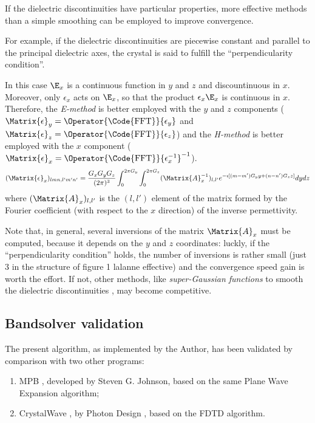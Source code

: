 If the dielectric discontinuities have particular properties, more
effective methods than a simple smoothing can be employed
to improve convergence.

For example, if the dielectric discontinuities are piecewise constant
and parallel to the principal dielectric axes, the crystal is said to
fulfill the ``perpendicularity condition''.


In this case $\E_x$ is a continuous function in $y$ and $z$ and
discountinuous in $x$. Moreover, only $\epsilon_x$ acts on $\E_x$, so
that the product $\epsilon_x \E_x$ is continuous in $x$. Therefore,
the \emph{E-method} is better employed with the $y$ and $z$ components
($\Matrix{\epsilon}_y = \Operator{\mbox{\Code{FFT}}}{\epsilon_y}$ and
$\Matrix{\epsilon}_z = \Operator{\mbox{\Code{FFT}}}{\epsilon_z}$) and
the \emph{H-method} is better employed with the $x$ component
($\Matrix{\epsilon}_x = \Operator{\mbox{\Code{FFT}}}{\epsilon_x^{-1}}^{-1}$).
$$
(\Matrix{\epsilon}_x)_{lmn,l'm'n'} = \frac{G_x G_y G_z}{(2 \pi)^3}\int_0^{2
  \pi G_y} \int_0^{2 \pi G_z} (\Matrix{A}_x^{-1})_{l,l'}
e^{-\imath[(m-m') G_y y + (n-n') G_z z]} dy dz
$$
where $(\Matrix{A}_x)_{l,l'}$ is the $(l,l')$ element of the matrix
formed by the Fourier coefficient (with respect to the $x$ direction)
of the inverse permettivity.

Note that, in general, several inversions of the matrix $\Matrix{A}_x$
must be computed, because it depends on the $y$ and $z$ coordinates:
luckly, if the ``perpendicularity condition'' holds, the number of
inversions is rather small (just 3 in the structure of figure 1
lalanne effective) and the convergence speed gain is worth the
effort. If not, other methods, like \emph{super-Gaussian functions} to
smooth the dielectric discontinuities \cite{villeneuve_photonic} , may
become competitive.

\subsection{Bandsolver validation}

The present algorithm, as implemented by the Author, has been
validated by comparison with two other programs:
\begin{enumerate}
\item
  MPB \cite{mpb}, developed by Steven G. Johnson, based on the same
  Plane Wave Expansion algorithm;
\item
  CrystalWave \cite{crystalwave}, by Photon Design \cite{photond},
  based on the FDTD algorithm.
\end{enumerate}

